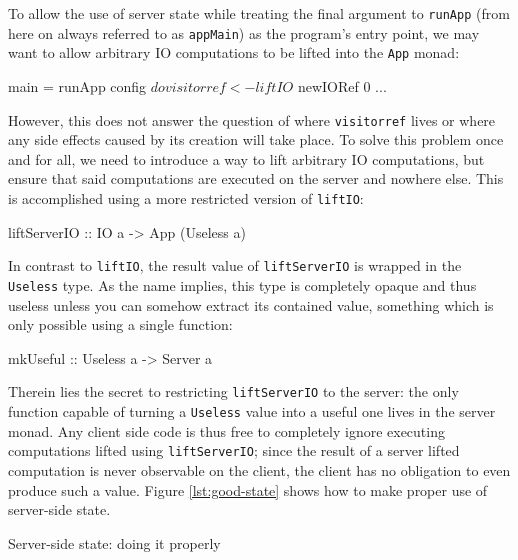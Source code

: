 \documentclass[preprint]{sigplanconf}
\begin{document}
To allow the use of server state while treating the final argument to
\lstinline!runApp! (from here on always referred to as \lstinline!appMain!)
as the program's entry point, we may want to allow arbitrary IO computations to
be lifted into the \lstinline!App! monad:

\begin{code}
main = runApp config $ do
  visitorref <- liftIO $ newIORef 0
  ...
\end{code}

However, this does not answer the question of where \lstinline!visitorref!
lives or where any side effects caused by its creation will take place.
To solve this problem once and for all, we need to introduce a way to lift
arbitrary IO computations, but ensure that said computations are executed on
the server and nowhere else. This is accomplished using a more restricted
version of \lstinline!liftIO!:

\begin{code}
liftServerIO :: IO a -> App (Useless a)
\end{code}

In contrast to \lstinline!liftIO!, the result value of \lstinline!liftServerIO!
is wrapped in the \lstinline!Useless! type. As the name implies, this type is
completely opaque and thus useless unless you can somehow extract its contained
value, something which is only possible using a single function:

\begin{code}
mkUseful :: Useless a -> Server a
\end{code}

Therein lies the secret to restricting \lstinline!liftServerIO! to the
server: the only function capable of turning a \lstinline!Useless! value into
a useful one lives in the server monad. Any client side code is thus free to
completely ignore executing computations lifted using \lstinline!liftServerIO!;
since the result of a server lifted computation is never observable on the
client, the client has no obligation to even produce such a value.
Figure \ref{lst:good-state} shows how to make proper use of server-side state.

\begin{listingfloat}
\caption{Server-side state: doing it properly}
\label{lst:good-state}
\end{listingfloat}
\end{document}
